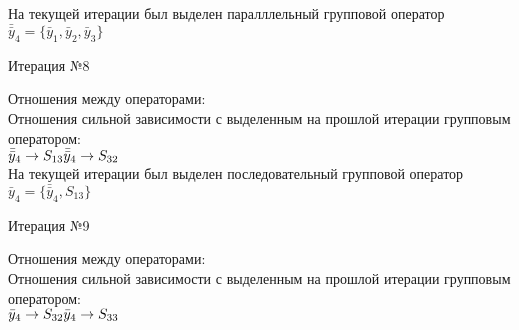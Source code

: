 \documentclass[a4paper,14pt]{article}
\begin{document}
%
На текущей итерации был выделен паралллельный групповой оператор $\bar{\bar{y}}_{4} = \{\bar{y}_{1}, \bar{y}_{2}, \bar{y}_{3}\}$
\\
\begin{center} Итерация №8 \end{center}
Отношения между операторами: \\
Отношения сильной зависимости с выделенным на прошлой итерации групповым оператором: \\ \newline
\begin{math}
    \bar{\bar{y}}_{4} \rightarrow S_{13} \\ 
\bar{\bar{y}}_{4} \rightarrow S_{32}
\end{math}\\ \newline
%
На текущей итерации был выделен последовательный групповой оператор $\bar{y}_{4} = \{\bar{\bar{y}}_{4}, S_{13}\}$
\\
\begin{center} Итерация №9 \end{center}
Отношения между операторами: \\
Отношения сильной зависимости с выделенным на прошлой итерации групповым оператором: \\ \newline
\begin{math}
    \bar{y}_{4} \rightarrow S_{32} \\ 
\bar{y}_{4} \rightarrow S_{33}
\end{math} \\ \\ \\ 
%
\end{document}
